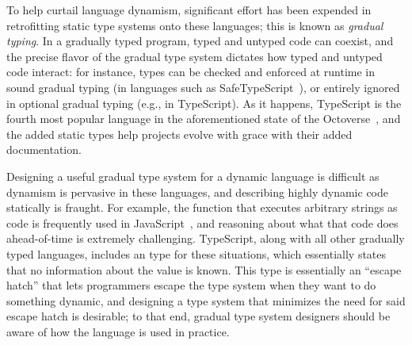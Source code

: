 \documentclass[sigplan,anonymous,review]{acmart}
\begin{document}
To help curtail language dynamism, significant effort has been expended in retrofitting static type systems onto these languages; this is known as \textit{gradual typing}.
In a gradually typed program, typed and untyped code can coexist, and the precise flavor of the gradual type system dictates how typed and untyped code interact: for instance, types can be checked and enforced at runtime in sound gradual typing (in languages such as SafeTypeScript~\cite{rastogi2015safe}), or entirely ignored in optional gradual typing (e.g., in TypeScript).
As it happens, TypeScript is the fourth most popular language in the aforementioned state of the Octoverse~\cite{state-of-octoverse-2021}, and the added static types help projects evolve with grace with their added documentation.

Designing a useful gradual type system for a dynamic language is difficult as dynamism is pervasive in these languages, and describing highly dynamic code statically is fraught.
For example, the  function that executes arbitrary strings as code is frequently used in JavaScript~\cite{richards2011eval}, and reasoning about what that code does ahead-of-time is extremely challenging.
TypeScript, along with all other gradually typed languages, includes an  type for these situations, which essentially states that no information about the value is known.
This  type is essentially an ``escape hatch'' that lets programmers escape the type system when they want to do something dynamic, and designing a type system that minimizes the need for said escape hatch is desirable; to that end, gradual type system designers should be aware of how the language is used in practice. %
\end{document}
